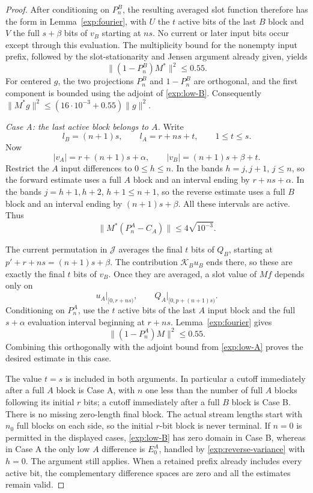 \begin{proof}
After conditioning on $P_n^B$, the resulting averaged slot function
therefore has the form in Lemma~\ref{exp:fourier}, with $U$ the
$t$ active bits of the last $B$ block and $V$ the full $s+\beta$
bits of $v_B$ starting at $ns$. No current or later input bits
occur except through this evaluation. The multiplicity bound for
the nonempty input prefix, followed by the slot-stationarity and
Jensen argument already given, yields
\begin{equation}
 \|(1-P_n^B)M^*\|^2\leq0.55.
 \label{exp:terminal-B}
\end{equation}
For centered $g$, the two projections $P_n^B$ and $1-P_n^B$ are
orthogonal, and the first component is bounded using the adjoint of
\eqref{exp:low-B}. Consequently
$\|M^*g\|^2\leq(16\cdot10^{-3}+0.55)\|g\|^2$.

\smallskip\noindent
\emph{Case A: the last active block belongs to $A$.}
Write
\[
 l_B=(n+1)s,\qquad l_A=r+ns+t,\qquad1\leq t\leq s.
\]
Now
\[
 |v_A|=r+(n+1)s+\alpha,
 \qquad |v_B|=(n+1)s+\beta+t.
\]
Restrict the $A$ input differences to $0\leq h\leq n$. In the
bands $h=j,j+1$, $j\leq n$, so the forward estimate uses a full
$A$ block and an interval ending by $r+ns+\alpha$. In the bands
$j=h+1,h+2$, $h+1\leq n+1$, so the reverse estimate uses a
full $B$ block and an interval ending by $(n+1)s+\beta$.
All these intervals are active. Thus
\begin{equation}
 \|M^*(P_n^A-C_A)\|\leq4\sqrt{10^{-3}}.
 \label{exp:low-A}
\end{equation}

The current permutation in $\mathcal J$ averages the final $t$
bits of $Q_B$, starting at
$p'+r+ns=(n+1)s+\beta$. The contribution
$\mathcal K_Bu_B$ ends there, so these are exactly the final
$t$ bits of $v_B$. Once they are averaged, a slot value of $Mf$
depends only on
\[
 u_A\big|_{[0,r+ns)},\qquad
 Q_A\big|_{[0,p+(n+1)s)}.
\]
Conditioning on $P_n^A$, use the $t$ active bits of the last $A$
input block and the full $s+\alpha$ evaluation interval beginning
at $r+ns$. Lemma~\ref{exp:fourier} gives
\begin{equation}
 \|(1-P_n^A)M\|^2\leq0.55.
 \label{exp:terminal-A}
\end{equation}
Combining this orthogonally with the adjoint bound from
\eqref{exp:low-A} proves the desired estimate in this case.

The value $t=s$ is included in both arguments. In particular a
cutoff immediately after a full $A$ block is Case A, with $n$ one
less than the number of full $A$ blocks following its initial
$r$ bits; a cutoff immediately after a full $B$ block is Case B.
There is no missing zero-length final block. The actual stream
lengths start with $n_0$ full blocks on each side, so the initial
$r$-bit block is never terminal. If $n=0$ is permitted in the
displayed cases, \eqref{exp:low-B} has zero domain in Case B,
whereas in Case A the only low $A$ difference is $E_0^A$, handled
by \eqref{exp:reverse-variance} with $h=0$. The argument still
applies. When a retained prefix already includes every active bit,
the complementary difference spaces are zero and all the estimates
remain valid.
\end{proof}

